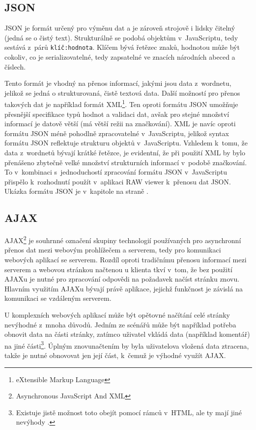 \documentclass[a4paper,11pt,openany,twoside]{book}
\newcommand{\simplywn}{RAW viewer }
\newcommand{\itNameRef}[1]{\textit{\nameref{#1}}}
\begin{document}
				\subsection{JSON}
				\label{cha:json}

					JSON je formát určený pro výměnu dat a je zároveň strojově i lidsky čitelný (jedná se o čistý text). Strukturálně se podobá objektům v~JavaScriptu, tedy sestává z~párů \texttt{klíč:hodnota}. Klíčem bývá řetězec znaků, hodnotou může být cokoliv, co je serializovatelné, tedy zapsatelné ve znacích národních abeced a číslech. \parencite{jsonDoc}

					Tento formát je vhodný na přenos informací, jakými jsou data z~wordnetu, jelikož se jedná o strukturovaná, čistě textová data. Další možností pro přenos takových dat je například formát XML\footnote{eXtensible Markup Language}. Ten oproti formátu JSON umožňuje přesnější specifikace typů hodnot a validaci dat, avšak pro stejné množství informací je datově větší (má větší režii na značkování). XML je navíc oproti formátu JSON méně pohodlně zpracovatelné v~JavaScriptu, jelikož syntax formátu JSON reflektuje strukturu objektů v~JavaScriptu. Vzhledem k~tomu, že data z~wordnetů bývají krátké řetězce, je evidentní, že při použití XML by bylo přenášeno zbytečně velké množství strukturních informací v~podobě značkování. \parencite{jsonVsXML} To v~kombinaci s~jednoduchostí zpracování formátu JSON v~JavaScriptu přispělo k~rozhodnutí použít v~aplikaci \simplywn k~přenosu dat JSON. Ukázka formátu JSON je v~kapitole \itNameRef{cha:answerStruct} na straně \pageref{cha:answerStruct}.

				\subsection{AJAX}

					AJAX\footnote{Asynchronous JavaScript And XML} je souhrnné označení skupiny technologií používaných pro asynchronní přenos dat mezi webovým prohlížečem a serverem, tedy pro komunikaci webových aplikací se serverem. Rozdíl oproti tradičnímu přenosu informací mezi serverem a webovou stránkou načtenou u klienta tkví v~tom, že bez použití AJAXu je nutné pro zpracování odpovědi na požadavek načíst stránku znovu. Hlavním využitím AJAXu bývají právě aplikace, jejichž funkčnost je závislá na komunikaci se vzdáleným serverem. \parencite{garrett2005ajax}

					U komplexních webových aplikací může být opětovné načítání celé stránky nevýhodné z~mnoha důvodů. Jedním ze scénářů může být například potřeba obnovit data na části stránky, zatímco uživatel vkládá data (například komentář) na jiné části\footnote{Existuje jistě možnost toto obejít pomocí rámců v~HTML, ale ty mají jiné nevýhody \parencite{frames2013bad}.}. Úplným znovunačtením by byla uživatelova vložená data ztracena, takže je nutné obnovovat jen její část, k~čemuž je výhodné využít AJAX.
\end{document}
